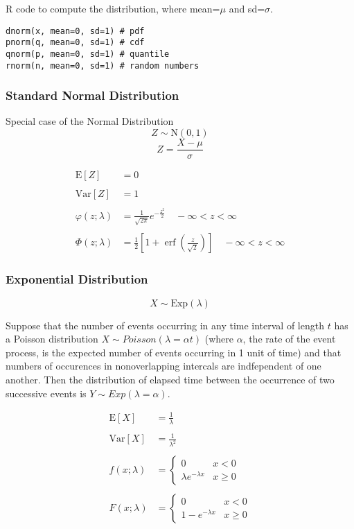 \documentclass{article}
\begin{document}
R code to compute the distribution, where mean=$\mu$ and sd=$\sigma$.
\begin{lstlisting}
dnorm(x, mean=0, sd=1) # pdf
pnorm(q, mean=0, sd=1) # cdf
qnorm(p, mean=0, sd=1) # quantile
rnorm(n, mean=0, sd=1) # random numbers
\end{lstlisting}

\subsubsection*{Standard Normal Distribution}
Special case of the Normal Distribution
$$ Z \sim \mathrm{N}(0, 1)$$
$$ Z = \frac{X - \mu}{\sigma}$$

\begin{align*}
    \mathrm{E}[Z] &= 0 \\ \\
    \mathrm{Var}[Z] &= 1 \\ \\
    \varphi(z; \lambda) &= \frac{1}{\sqrt{2\pi} } e^{-\frac{z^2}{2}} \quad - \infty < z < \infty\\ \\
    \Phi(z; \lambda) &= \frac{1}{2} \left[1 + \operatorname{erf}\left(\frac{z}{\sqrt 2 }\right)\right]  \quad - \infty < z < \infty
\end{align*}

\subsubsection*{Exponential Distribution}
$$ X \sim \mathrm{Exp}(\lambda)$$

Suppose that the number of events occurring in any time interval of length $t$ has a Poisson distribution $X \sim Poisson(\lambda = \alpha t)$ (where $\alpha$, the rate of the event process, is the expected number of events occurring in 1 unit of time) and that numbers of occurences in nonoverlapping intercals are indfependent of one another. Then the distribution of elapsed time between the occurrence of two successive events is $Y \sim Exp(\lambda = \alpha)$.

\begin{align*}
    \mathrm{E}[X] &= \frac{1}{\lambda} \\ \\
    \mathrm{Var}[X] &= \frac{1}{\lambda^2} \\ \\
    f(x;\lambda) &=
    \begin{cases}
        0 & x < 0 \\
        \lambda e^{-\lambda x} & x \geq 0
    \end{cases} \\ \\
    F(x;\lambda) &=
    \begin{cases}
        0 & x < 0 \\
        1 - e^{-\lambda x} & x \geq 0
    \end{cases}
\end{align*}
\end{document}
